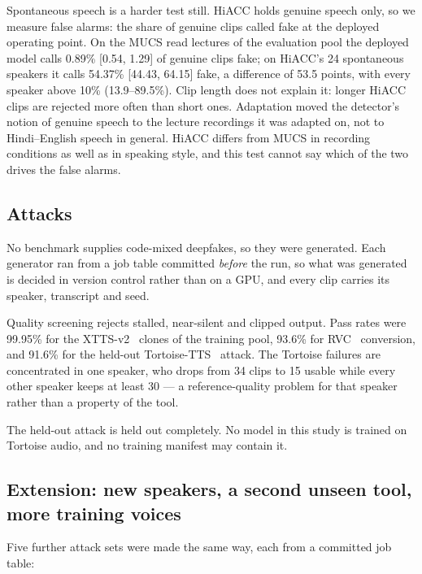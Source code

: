 Spontaneous speech is a harder test still. HiACC holds genuine speech only, so we
measure false alarms: the share of genuine clips called fake at the deployed operating
point. On the MUCS read lectures of the evaluation pool the deployed model calls
0.89\% [0.54, 1.29] of genuine clips fake; on HiACC's 24 spontaneous speakers it calls
54.37\% [44.43, 64.15] fake, a difference of 53.5 points, with every speaker above
10\% (13.9--89.5\%). Clip length does not explain it: longer HiACC clips are rejected
more often than short ones. Adaptation moved the detector's notion of genuine speech
to the lecture recordings it was adapted on, not to Hindi--English speech in general.
HiACC differs from MUCS in recording conditions as well as in speaking style, and this
test cannot say which of the two drives the false alarms.

\subsection{Attacks}

No benchmark supplies code-mixed deepfakes, so they were generated. Each generator
ran from a job table committed \emph{before} the run, so what was generated is
decided in version control rather than on a GPU, and every clip carries its speaker,
transcript and seed.

Quality screening rejects stalled, near-silent and clipped output. Pass rates were
99.95\% for the XTTS-v2~\cite{casanova2024xtts} clones of the training pool, 93.6\% for
RVC~\cite{rvc2023} conversion, and 91.6\% for the held-out
Tortoise-TTS~\cite{betker2023tortoise} attack. The Tortoise failures are concentrated
in one speaker, who drops from 34 clips to 15 usable while every other speaker keeps
at least 30 --- a reference-quality problem for that speaker rather than a property
of the tool.

The held-out attack is held out completely. No model in this study is trained on
Tortoise audio, and no training manifest may contain it.

\subsection{Extension: new speakers, a second unseen tool, more training voices}
\label{sec:data-extension}

Five further attack sets were made the same way, each from a committed job table:

